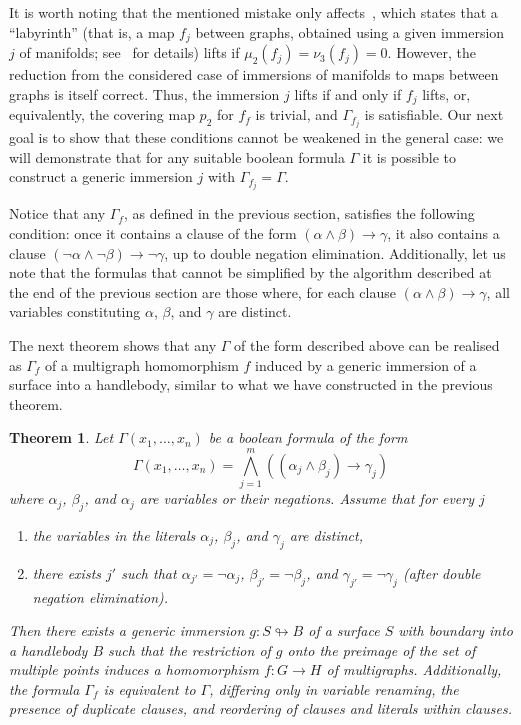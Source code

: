 \documentclass[a4paper,12pt,reqno,oneside]{amsart}
\theoremstyle{plain}
\newtheorem{theorem}{Theorem}
\theoremstyle{definition}
\theoremstyle{plain}
\newcommand{\from}{\colon}
\begin{document}
It is worth noting that the mentioned mistake only affects~\cite[Lemme 1.7]{poen_fr}, which states
that a ``labyrinth'' (that is, a map $f_j$ between graphs, obtained using a given
immersion $j$ of manifolds; see~\cite[Definition 3]{poen_fr} for details) lifts if
$\mu_2(f_j) = \nu_3(f_j) = 0$. However, the reduction from the considered case of immersions of
manifolds to maps between graphs is itself correct. Thus, the immersion $j$ lifts if and only if
$f_j$ lifts, or, equivalently, the covering map $p_2$ for $f_f$ is trivial, and $\Gamma_{f_j}$ is
satisfiable. Our next goal is to show that these conditions cannot be weakened in the general case:
we will demonstrate that for any suitable boolean formula $\Gamma$ it is possible to construct a
generic immersion $j$ with $\Gamma_{f_j} = \Gamma$.

Notice that any $\Gamma_f$, as defined in the previous section, satisfies the following condition:
once it contains a clause of the form $(\alpha \land \beta) \to \gamma$, it also contains a clause
$(\neg \alpha \land \neg \beta) \to \neg \gamma$, up to double negation elimination. Additionally,
let us note that the formulas that cannot be simplified by the algorithm described at the end of
the previous section are those where, for each clause $(\alpha \land \beta) \to \gamma$, all
variables constituting $\alpha$, $\beta$, and $\gamma$ are distinct.

The next theorem shows that any $\Gamma$ of the form described above can be realised as $\Gamma_f$
of a multigraph homomorphism $f$ induced by a generic immersion of a surface into a handlebody, similar
to what we have constructed in the previous theorem.

\begin{theorem}\label{thm:realisation_gamma}
  Let $\Gamma(x_1, \dots, x_n)$ be a boolean formula of the form
  \[
    \Gamma(x_1, \dots, x_n) = \bigwedge_{j=1}^m \left((\alpha_j \wedge \beta_j) \to \gamma_j\right)
  \]
  where $\alpha_j$, $\beta_j$, and $\alpha_j$ are variables or their negations. Assume that for every $j$
  \begin{enumerate}
  \item the variables in the literals $\alpha_j$, $\beta_j$, and $\gamma_j$ are distinct,
  \item there exists $j'$ such that $\alpha_{j'} = \neg \alpha_j$, $\beta_{j'} = \neg \beta_{j}$, and $\gamma_{j'}
    = \neg \gamma_j$ (after double negation elimination).
  \end{enumerate}

  Then there exists a generic immersion $g \from S \looparrowright B$ of a surface $S$ with
  boundary into a handlebody $B$ such that the restriction of $g$ onto the preimage of the set of
  multiple points induces a homomorphism $f \from G \to H$ of multigraphs. Additionally, the formula
  $\Gamma_f$ is equivalent to $\Gamma$, differing only in variable renaming, the presence of
  duplicate clauses, and reordering of clauses and literals within clauses.
\end{theorem}
\end{document}
